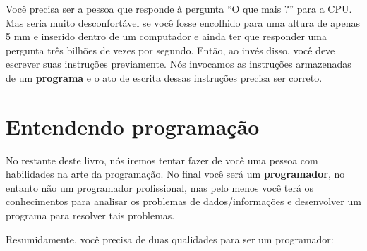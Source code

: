 Você precisa ser a pessoa que responde à pergunta ``O que mais ?'' 
para a CPU. Mas seria muito desconfortável se você fosse encolhido
para uma altura de apenas 5 mm e inserido dentro de um computador 
e ainda ter que responder uma pergunta três bilhões de vezes por segundo.
Então, ao invés disso, você deve escrever suas instruções previamente.
Nós invocamos as instruções armazenadas de um {\bf programa} e o
ato de escrita dessas instruções precisa ser correto.
%

\section{Entendendo programação}
%

No restante deste livro, nós iremos tentar fazer de você uma pessoa
com habilidades na arte da programação. No final você será um 
{\bf programador}, no entanto não um programador profissional, mas
pelo menos você terá os conhecimentos para analisar os problemas
de dados/informações e desenvolver um programa para resolver tais 
problemas.
%

%

Resumidamente, você precisa de duas qualidades para ser um programador:
%

